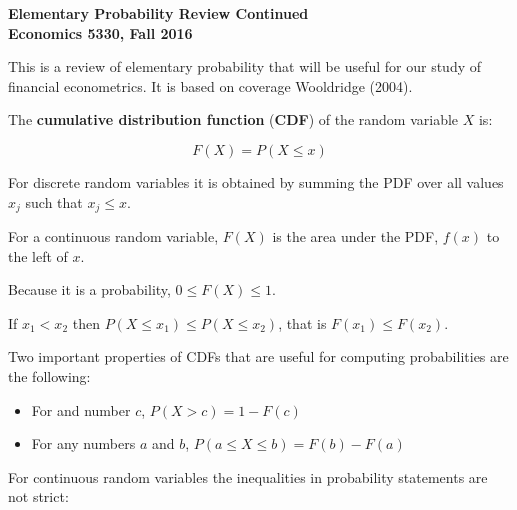 \documentclass[11pt]{article}
\begin{document}
\pagestyle{empty}

\textbf{Elementary Probability Review Continued} \\
\textbf{Economics 5330, Fall 2016} \\
\vspace{3.5mm}


This is a review of elementary probability that will be useful for our study of financial econometrics. It is based on coverage Wooldridge (2004).

\vspace{3.5mm}

The \textbf{cumulative distribution function} (\textbf{CDF}) of the random variable $X$ is:

\begin{equation*}
F(X) = P(X \leq x)
\end{equation*}

\vspace{2mm}

For discrete random variables it is obtained by summing the PDF over all values $x_{j}$ such that $x_{j} \leq x$.

\vspace{2mm}

For a continuous random variable, $F(X)$ is the area under the PDF, $f(x)$ to the left of $x$.

\vspace{2mm}

Because it is a probability, $0 \leq F(X) \leq 1$.

\vspace{2mm}

If $x_{1} < x_{2}$ then $P(X \leq x_{1}) \leq P(X \leq x_{2})$, that is $F(x_{1}) \leq F(x_{2})$.

\vspace{2mm}

Two important properties of CDFs that are useful for computing probabilities are the following:

\begin{itemize}
 \item For and number $c$, $P(X > c) = 1 - F(c)$
 \item For any numbers $a$ and $b$, $P(a \leq X \leq b) = F(b) - F(a)$
\end{itemize}

\vspace{2mm}

For continuous random variables the inequalities in probability statements are not strict:
\end{document}
